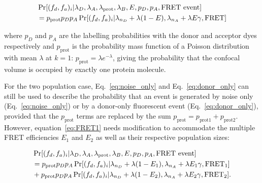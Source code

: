 \begin{equation}
\begin{aligned}
\footnotesize
&\Pr[(f_d, f_a)_i|\lambda_D, \lambda_A, \lambda_{\text{prot}}, \lambda_B, E, p_D, p_A, \text{FRET event}] \\
&= p_{\text{prot}}p_Dp_A\Pr[(f_d, f_a)_i|\lambda_{n_D}+\lambda(1-E), \lambda_{n_A}+\lambda E \gamma, \text{FRET}]
\label{eq:FRET1} 
\end{aligned}
\end{equation}

where $p_D$ and $p_A$ are the labelling probabilities with the donor and acceptor dyes respectively and $p_{\text{prot}}$ is the probability mass function of a Poisson distribution with mean $\lambda$ at $k=1$: $p_{\text{prot}}=\lambda e^{-\lambda}$, giving the probability that the confocal volume is occupied by exactly one protein molecule.

For the two population case, Eq.~\ref{eq:noise_only} and Eq.~\ref{eq:donor_only} can still be used to describe the probability that an event is generated by noise only (Eq.~\ref{eq:noise_only}) or by a donor-only fluorescent event (Eq.~\ref{eq:donor_only}), provided that the $p_{\text{prot}}$ terms are replaced by the sum $p_{\text{prot}}=p_{\text{prot1}}+p_{\text{prot2}}$. However, equation~\ref{eq:FRET1} needs modification to accommodate the multiple FRET efficiencies $E_1$ and $E_2$ as well as their respective population sizes: 

\begin{equation}
\begin{aligned}
\footnotesize
&\Pr[(f_d, f_a)_i|\lambda_D, \lambda_A, \lambda_{\text{prot}}, \lambda_B, E, p_D, p_A, \text{FRET event}] \\
&=p_{\text{prot}}p_Dp_A\Pr[(f_d, f_a)_i|\lambda_{n_D}+\lambda(1-E_1), \lambda_{n_A}+\lambda E_1 \gamma, \text{FRET$_1$}] \\
&+ p_{\text{prot}}p_Dp_A\Pr[(f_d, f_a)_i|\lambda_{n_D}+\lambda(1-E_2), \lambda_{n_A}+\lambda E_2 \gamma, \text{FRET$_2$}].
\label{eq:FRET2} 
\end{aligned}
\end{equation}


